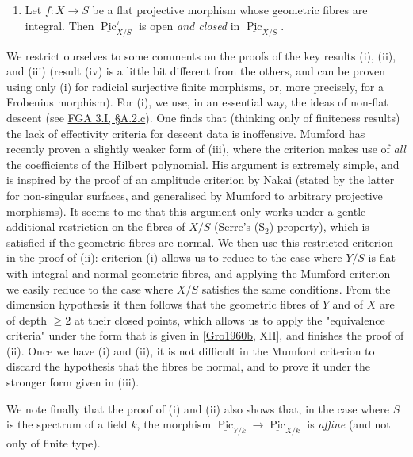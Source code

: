 \begin{remark}{}
    
 \begin{enumerate}
      
 \item[ix.]
        Let \(f\colon  X\to  S\) be a flat projective morphism whose geometric fibres are integral.
        Then \(\underline {\operatorname {Pic}}_{X/S}^\tau \) is open \emph{and closed} in \(\underline {\operatorname {Pic}}_{X/S}\).
      

    \end{enumerate}\par{}We restrict ourselves to some comments on the proofs of the key results (i), (ii), and (iii) (result (iv) is a little bit different from the others, and can be proven using only (i) for radicial surjective finite morphisms, or, more precisely, for a Frobenius morphism).
    For (i), we use, in an essential way, the ideas of non-flat descent (see \hyperref[fga3.i-a.2.c]{FGA 3.I, §A.2.c}).
    One finds that (thinking only of finiteness results) the lack of effectivity criteria for descent data is inoffensive.
    Mumford has recently proven a slightly weaker form of (iii), where the criterion makes use of \emph{all} the coefficients of the Hilbert polynomial.
    His argument is extremely simple, and is inspired by the proof of an amplitude criterion by Nakai (stated by the latter for non-singular surfaces, and generalised by Mumford to arbitrary projective morphisms).
    It seems to me that this argument only works under a gentle additional restriction on the fibres of \(X/S\) (Serre's (\(\text {S}_2\)) property), which is satisfied if the geometric fibres are normal.
    We then use this restricted criterion in the proof of (ii): criterion (i) allows us to reduce to the case where \(Y/S\) is flat with integral and normal geometric fibres, and applying the Mumford criterion we easily reduce to the case where \(X/S\) satisfies the same conditions.
    From the dimension hypothesis it then follows that the geometric fibres of \(Y\) and of \(X\) are of depth \(\geqslant 2\) at their closed points, which allows us to apply the "equivalence criteria" under the form that is given in [\hyperref[Gro1960b]{Gro1960b}, XII], and finishes the proof of (ii).
    Once we have (i) and (ii), it is not difficult in the Mumford criterion to discard the hypothesis that the fibres be normal, and to prove it under the stronger form given in (iii).
    
    We note finally that the proof of (i) and (ii) also shows that, in the case where \(S\) is the spectrum of a field \(k\), the morphism \(\underline {\operatorname {Pic}}_{Y/k}\to \underline {\operatorname {Pic}}_{X/k}\) is \emph{affine} (and not only of finite type).\end{remark}